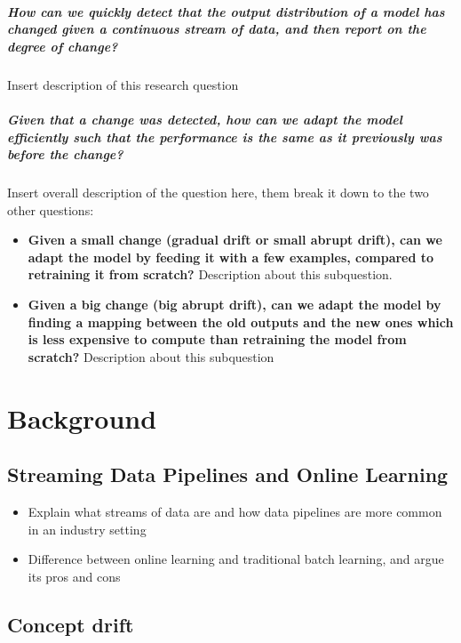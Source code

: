 \documentclass[12pt]{report}
\begin{document}
\paragraph*{How can we quickly detect that the output distribution of a model has changed given a continuous stream of data, and then report on the degree of change?} Insert description of this research question

\paragraph*{Given that a change was detected, how can we adapt the model efficiently such that the performance is the same as it previously was before the change?} Insert overall description of the question here, them break it down to the two other questions:
\begin{itemize}
    \item \textbf{Given a small change (gradual drift or small abrupt drift), can we adapt the model by feeding it with a few examples, compared to retraining it from scratch?} Description about this subquestion.
    \item \textbf{Given a big change (big abrupt drift), can we adapt the model by finding a mapping between the old outputs and the new ones which is less expensive to compute than retraining the model from scratch?} Description about this subquestion
\end{itemize}

\chapter{Background}

\section{Streaming Data Pipelines and Online Learning}

\begin{itemize}
    \item Explain what streams of data are and how data pipelines are more common in an industry setting
    \item Difference between online learning and traditional batch learning, and argue its pros and cons
\end{itemize}

\section{Concept drift}
\end{document}
